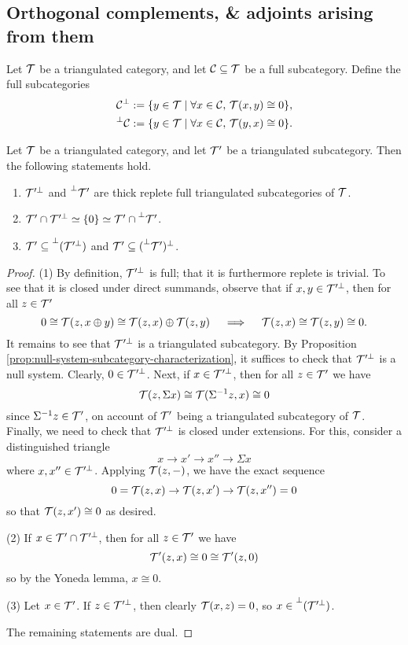 \subsection{Orthogonal complements, \& adjoints arising from them}
\begin{definition}
	Let \(\mathcal{T}\) be a triangulated category, and let \(\mathcal{C}\subseteq\mathcal{T}\) be a full subcategory. Define the full subcategories
	\begin{align*}
		\mathcal{C}^\perp := \{ y\in\mathcal{T}\mid \forall x\in\mathcal{C},\, \mathcal{T}(x,y) \cong 0 \}, \\
		\prescript{\perp}{}{\ensuremath{\mathcal{C}}} := \{ y\in\mathcal{T}\mid \forall x\in\mathcal{C},\, \mathcal{T}(y,x) \cong 0 \}.
	\end{align*}
\end{definition}
\begin{proposition}\label{prop:basic-triangulated-category-orthogonal-properties}
	Let \(\mathcal{T}\) be a triangulated category, and let \(\mathcal{T}'\) be a triangulated subcategory. Then the following statements hold.
	\begin{enumerate}[label=(\arabic*)]
	\item \(\mathcal{T}'^\perp\) and \(\prescript{\perp}{}{\ensuremath{\mathcal{T}}'}\) are thick replete full triangulated subcategories of \(\mathcal{T}\).
	\item \(\mathcal{T}'\cap\mathcal{T}'^\perp \simeq \{0\}\simeq \mathcal{T}'\cap\prescript{\perp}{}{\ensuremath{\mathcal{T}}'}\).
	\item \(\mathcal{T}' \subseteq \prescript{\perp}{}{(\ensuremath{\mathcal{T}}'^\perp)}\) and \(\mathcal{T}'\subseteq (\prescript{\perp}{}{\ensuremath{\mathcal{T}}'})^\perp\).
	\end{enumerate}
\end{proposition}
\begin{proof}
(1) By definition, \(\mathcal{T}'^\perp\) is full; that it is furthermore replete is trivial. To see that it is closed under direct summands, observe that if \(x,y\in\mathcal{T}'^\perp\), then for all \(z\in\mathcal{T}'\)
\[ 0 \cong \mathcal{T}(z,x\oplus y) \cong \mathcal{T}(z,x)\oplus\mathcal{T}(z,y)\quad\implies\quad \mathcal{T}(z,x)\cong\mathcal{T}(z,y)\cong 0.  \]
It remains to see that \(\mathcal{T}'^\perp\) is a triangulated subcategory. By Proposition \ref{prop:null-system-subcategory-characterization}, it suffices to check that \(\mathcal{T}'^\perp\)
is a null system. Clearly, \(0\in\mathcal{T}'^\perp\). Next, if \(x\in\mathcal{T}'^\perp\), then for all \(z\in\mathcal{T}'\) we have
\[ \mathcal{T}(z,\Sigma x) \cong \mathcal{T}(\Sigma^{-1}z,x) \cong 0 \]
since \(\Sigma^{-1}z\in\mathcal{T}'\), on account of \(\mathcal{T}'\) being a triangulated subcategory of \(\mathcal{T}\). Finally, we need to check that \(\mathcal{T}'^\perp\) is closed under extensions. For this,
consider a distinguished triangle
\[ x \to x' \to x'' \to \Sigma x \]
where \(x,x''\in\mathcal{T}'^\perp\). Applying \(\mathcal{T}(z,-)\), we have the exact sequence
\[ 0 = \mathcal{T}(z,x) \to \mathcal{T}(z,x')\to\mathcal{T}(z,x'') = 0 \]
so that \(\mathcal{T}(z,x') \cong 0\) as desired.

(2) If \(x\in\mathcal{T}'\cap\mathcal{T}'^\perp\), then for all \(z\in\mathcal{T}'\) we have
\[ \mathcal{T}'(z,x) \cong 0 \cong \mathcal{T}'(z,0) \]
so by the Yoneda lemma, \(x\cong 0\).

(3) Let \(x\in\mathcal{T}'\). If \(z\in\mathcal{T}'^\perp\), then clearly \(\mathcal{T}(x,z) = 0\), so \(x\in\prescript{\perp}{}{(\ensuremath{\mathcal{T}}'^\perp)}\).

The remaining statements are dual.
\end{proof}
